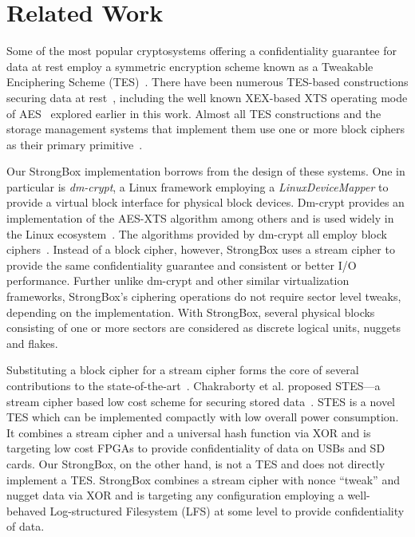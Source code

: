\section{Related Work} \label{sec:sb-related}

Some of the most popular cryptosystems offering a confidentiality
guarantee for data at rest employ a symmetric encryption scheme known
as a Tweakable Enciphering Scheme (TES)~\cite{STES,XEX}. There have
been numerous TES-based constructions securing data at
rest~\cite{STES,CMC,HCTR}, including the well known XEX-based XTS
operating mode of AES~\cite{XTS} explored earlier in this work. Almost
all TES constructions and the storage management systems that
implement them use one or more block ciphers as their primary
primitive~\cite{TES-From-Stream-Cipher,STES}.

Our StrongBox implementation borrows from the design of these systems. One in
particular is \emph{dm-crypt}, a Linux framework employing a
\textit{LinuxDeviceMapper} to provide a virtual block interface for physical
block devices. Dm-crypt provides an implementation of the AES-XTS algorithm among
others and is used widely in the Linux ecosystem~\cite{DmC-Android, dmcrypt}.
The algorithms provided by dm-crypt all employ block ciphers~\cite{dmcrypt}.
Instead of a block cipher, however, StrongBox uses a stream cipher to provide
the same confidentiality guarantee and consistent or better I/O performance.
Further unlike dm-crypt and other similar virtualization frameworks, StrongBox's
ciphering operations do not require sector level tweaks, depending on the
implementation. With StrongBox, several physical blocks consisting of one or
more sectors are considered as discrete logical units, \ie nuggets and flakes.

Substituting a block cipher for a stream cipher forms the core of several
contributions to the state-of-the-art~\cite{STES, TES-From-Stream-Cipher}.
Chakraborty et al. proposed STES---a stream cipher based low cost scheme for
securing stored data~\cite{STES}. STES is a novel TES which can be implemented
compactly with low overall power consumption. It combines a stream cipher and a
universal hash function via XOR and is targeting low cost FPGAs to provide
confidentiality of data on USBs and SD cards. Our StrongBox, on the other hand,
is not a TES and does not directly implement a TES. StrongBox combines a stream
cipher with nonce ``tweak'' and nugget data via XOR and is targeting any
configuration employing a well-behaved Log-structured Filesystem (LFS) at some
level to provide confidentiality of data.

